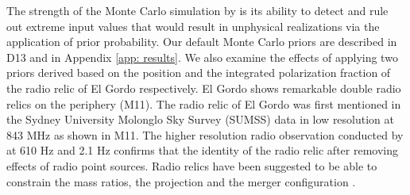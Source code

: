 The strength of the Monte Carlo simulation by  is its ability
to detect and rule out extreme input values that would result in
unphysical realizations via the application of prior probability. 
Our default Monte Carlo priors are described in D13 and in Appendix
\ref{app: results}. We also examine the effects of applying 
two priors derived based on the position and the integrated polarization
fraction of the radio relic of El Gordo respectively. El Gordo shows
remarkable double radio relics on the periphery (M11). The radio relic  of
El Gordo was first mentioned in the Sydney University Molonglo Sky Survey
(SUMSS) data in low resolution at 843 MHz \citep{Mauch03} as shown in M11.
The higher resolution radio observation conducted by \cite{L13} at 610
\mega Hz and 2.1 \giga Hz confirms that the identity of the radio relic
after removing effects of radio point sources. Radio relics have been
suggested to be able to constrain the mass ratios, the projection and the
merger configuration \citep{vanWeeren10}. 



